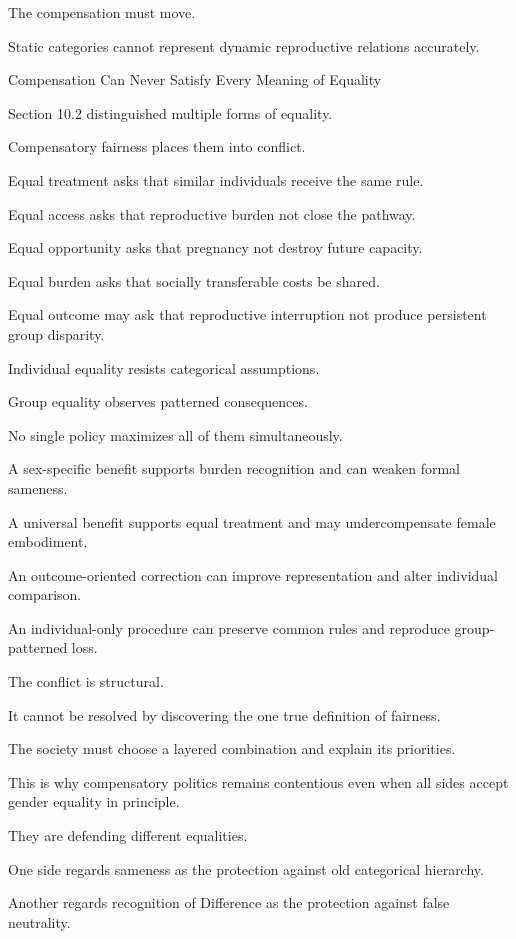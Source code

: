 The compensation must move.

Static categories cannot represent dynamic reproductive relations accurately.

Compensation Can Never Satisfy Every Meaning of Equality

Section 10.2 distinguished multiple forms of equality.

Compensatory fairness places them into conflict.

Equal treatment asks that similar individuals receive the same rule.

Equal access asks that reproductive burden not close the pathway.

Equal opportunity asks that pregnancy not destroy future capacity.

Equal burden asks that socially transferable costs be shared.

Equal outcome may ask that reproductive interruption not produce persistent group disparity.

Individual equality resists categorical assumptions.

Group equality observes patterned consequences.

No single policy maximizes all of them simultaneously.

A sex-specific benefit supports burden recognition and can weaken formal sameness.

A universal benefit supports equal treatment and may undercompensate female embodiment.

An outcome-oriented correction can improve representation and alter individual comparison.

An individual-only procedure can preserve common rules and reproduce group-patterned loss.

The conflict is structural.

It cannot be resolved by discovering the one true definition of fairness.

The society must choose a layered combination and explain its priorities.

This is why compensatory politics remains contentious even when all sides accept gender equality in principle.

They are defending different equalities.

One side regards sameness as the protection against old categorical hierarchy.

Another regards recognition of Difference as the protection against false neutrality.

